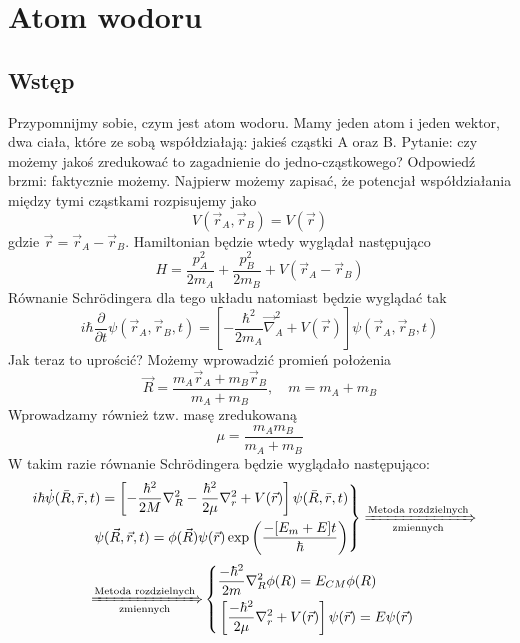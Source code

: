 \section{Atom wodoru}
\subsection{Wstęp}
Przypomnijmy sobie, czym jest atom wodoru. Mamy jeden atom i jeden wektor, dwa ciała, które ze sobą współdziałają: jakieś cząstki A oraz B. Pytanie: czy możemy jakoś zredukować to zagadnienie do jedno-cząstkowego? Odpowiedź brzmi: faktycznie możemy. Najpierw możemy zapisać, że potencjał współdziałania między tymi cząstkami rozpisujemy jako
$$
V(\vec{r}_A, \vec{r}_B) = V(\vec{r})
$$
gdzie $\vec{r} = \vec{r}_A - \vec{r}_B$. Hamiltonian będzie wtedy wyglądał następująco
\begin{equation*}
	H =  \frac{p_{A}^{2}}{2 m_{A}}+\frac{p_{B}^{2}}{2 m_{B}} + V(\vec{r} _A- \vec{r}_B)
\end{equation*}
Równanie Schrödingera dla tego układu natomiast będzie wyglądać tak
\begin{equation*}
	i \hbar \frac{\partial}{\partial t} \psi \left(\vec{r}_{A}, \vec{r}_{B}, t\right) = \left[-\frac{\hbar^{2}}{2 m_{A}} \vec{\nabla}_{A}^{2}+V(\vec{r})\right] \psi \left(\vec{r}_{A}, \vec{r}_{B}, t\right)
\end{equation*}
Jak teraz to uprościć? Możemy wprowadzić promień położenia
\begin{equation*}
	\vec{R}=\frac{m_{A} \vec{r}_{A}+m_{B} \vec{r}_{B}}{m_{A}+m_{B}}, \quad m = m_A + m_B
\end{equation*}
Wprowadzamy również tzw. masę zredukowaną
\begin{equation*}
	\mu = \frac{m_A m_B}{m_A + m_B}
\end{equation*}
W takim razie równanie Schrödingera będzie wyglądało następująco:
\begin{align*}
	&\left.
	\begin{aligned}
		i \hbar\dot{\psi}(\bar{R}, \bar{r}, t)  =  \left[-\frac{\hbar^{2}}{2 M} \nabla_{R}^{2}-\frac{\hbar^{2}}{2 \mu} \nabla_{r}^{2}+V(\vec{r})\right]  \psi(\bar{R}, \bar{r}, t) \\
		\psi(\vec{R}, \vec{r}, t)=\phi(\vec{R}) \psi(\vec{r}) \exp \left(\frac{-[E_m + E]t}{\hbar}\right)
	\end{aligned}
	\right\}
	\xRightarrow[\text{zmiennych}]{\text{Metoda rozdzielnych}}
\end{align*}
\begin{align*}
	\xRightarrow[\text{zmiennych}]{\text{Metoda rozdzielnych}}
	&\left\{
	\begin{aligned}
		&\frac{-\hbar^{2}}{2 m} \nabla_{R}^{2} \phi(R)=E_{CM} \phi(R)\\
		&\left[\frac{-\hbar^{2}}{2 \mu} \nabla_{r}^{2}+V(\vec{r})\right] \psi(\vec{r})=E \psi(\vec{r})
	\end{aligned}
	\right.
\end{align*}
